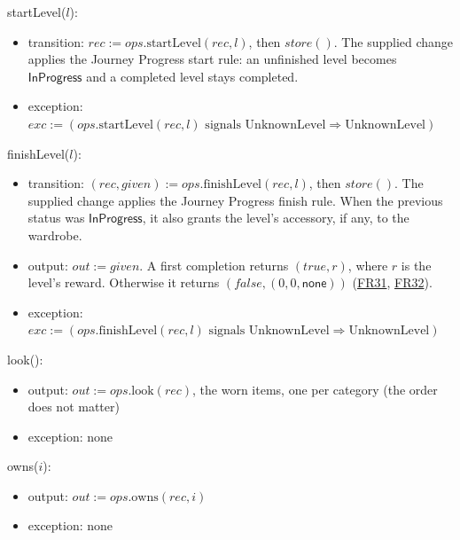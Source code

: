 \documentclass[10pt, titlepage]{article}
\newcommand{\srsurl}{https://team-hindsight.github.io/ophthamology-game/SRS/SRS.pdf}
\newcommand{\srsitemref}[2]{\href{\srsurl\#nameddest=#1}{#2}}
\newcommand{\T}[1]{\mathit{#1}}          %
\newcommand{\V}[1]{\mathsf{#1}}          %
\newcommand{\out}{\mathit{out}}
\newcommand{\exc}{\mathit{exc}}
\newcommand{\true}{\mathit{true}}
\newcommand{\false}{\mathit{false}}
\begin{document}
\begin{samepage}
\noindent startLevel($l$):
\begin{itemize}
\item transition: $\T{rec} := \T{ops}.\text{startLevel}(\T{rec},l)$,
  then $\T{store}()$. The supplied change applies the Journey Progress
  start rule: an unfinished level becomes $\V{InProgress}$ and a
  completed level stays completed.
\item exception: $\exc := (\T{ops}.\text{startLevel}(\T{rec}, l)
  \text{ signals UnknownLevel} \Rightarrow \text{UnknownLevel})$
\end{itemize}
\end{samepage}
\par\pagebreak[0]

\begin{samepage}
\noindent finishLevel($l$):
\begin{itemize}
\item transition: $(\T{rec}, \T{given}) :=
  \T{ops}.\text{finishLevel}(\T{rec}, l)$, then $\T{store}()$.
  The supplied change applies the Journey Progress finish rule.
  When the previous status was $\V{InProgress}$, it also grants
  the level's accessory, if any, to the wardrobe.
\item output: $\out := \T{given}$. A first completion returns
  $(\true,r)$, where $r$ is the level's reward. Otherwise it returns
  $(\false,(0,0,\V{none}))$
  (\srsitemref{FR_FirstReward}{FR31},
  \srsitemref{FR_NoDuplicateReward}{FR32}).
\item exception: $\exc := (\T{ops}.\text{finishLevel}(\T{rec}, l)
  \text{ signals UnknownLevel} \Rightarrow \text{UnknownLevel})$
\end{itemize}
\end{samepage}
\par\pagebreak[0]

\begin{samepage}
\noindent look():
\begin{itemize}
\item output: $\out := \T{ops}.\text{look}(\T{rec})$, the worn items, one
  per category (the order does not matter)
\item exception: none
\end{itemize}
\end{samepage}
\par\pagebreak[0]

\begin{samepage}
\noindent owns($i$):
\begin{itemize}
\item output: $\out := \T{ops}.\text{owns}(\T{rec}, i)$
\item exception: none
\end{itemize}
\end{samepage}
\par\pagebreak[0]
\end{document}
